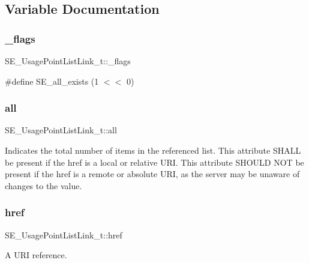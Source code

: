 \subsection{Variable Documentation}
\mbox{\label{group__UsagePointListLink_gac8530fb930140ba77346df8dbd8c7f34}} 
\subsubsection{\texorpdfstring{\+\_\+flags}{\_flags}}
{\footnotesize\ttfamily S\+E\+\_\+\+Usage\+Point\+List\+Link\+\_\+t\+::\+\_\+flags}

\#define S\+E\+\_\+all\+\_\+exists (1 $<$$<$ 0) \mbox{\label{group__UsagePointListLink_ga8d1a435546d34b5044cd257654412458}} 
\subsubsection{\texorpdfstring{all}{all}}
{\footnotesize\ttfamily S\+E\+\_\+\+Usage\+Point\+List\+Link\+\_\+t\+::all}

Indicates the total number of items in the referenced list. This attribute S\+H\+A\+LL be present if the href is a local or relative U\+RI. This attribute S\+H\+O\+U\+LD N\+OT be present if the href is a remote or absolute U\+RI, as the server may be unaware of changes to the value. \mbox{\label{group__UsagePointListLink_gad24ca03d23c037649b06258caa10524e}} 
\subsubsection{\texorpdfstring{href}{href}}
{\footnotesize\ttfamily S\+E\+\_\+\+Usage\+Point\+List\+Link\+\_\+t\+::href}

A U\+RI reference. 